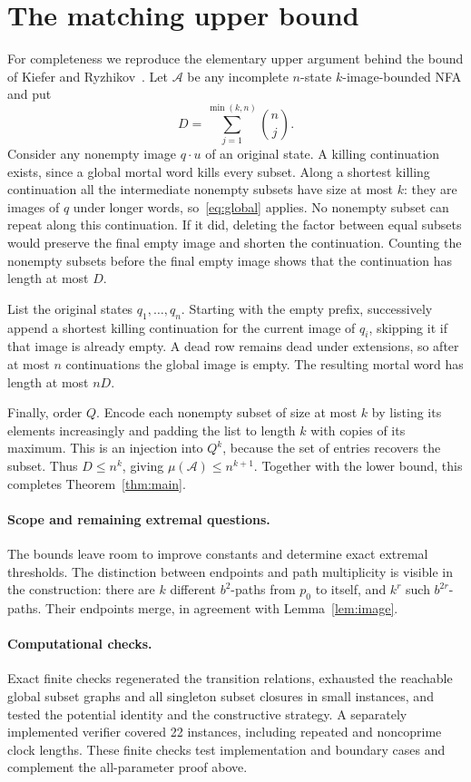 \documentclass[acmsmall,screen,nonacm,11pt]{acmart}
\newcommand{\calA}{\mathcal{A}}
\begin{document}
\section{The matching upper bound}

For completeness we reproduce the elementary upper argument behind the
bound of Kiefer and Ryzhikov~\cite[Section~9]{KR2025}.
Let $\calA$ be any incomplete $n$-state $k$-image-bounded NFA and put
\[
 D=\sum_{j=1}^{\min(k,n)}\binom nj.
\]
Consider any nonempty image $q\cdot u$ of an original state.
A killing continuation exists, since a global mortal word kills every
subset. Along a shortest killing continuation all the intermediate
nonempty subsets have size at most $k$: they are images of $q$ under
longer words, so~\eqref{eq:global} applies.
No nonempty subset can repeat along this continuation. If it did, deleting
the factor between equal subsets would preserve the final empty image and
shorten the continuation. Counting the nonempty subsets before the final
empty image shows that the continuation has length at most $D$.

List the original states $q_1,\ldots,q_n$. Starting with the empty prefix,
successively append a shortest killing continuation for the current image
of $q_i$, skipping it if that image is already empty. A dead row remains
dead under extensions, so after at most $n$ continuations the global image
is empty. The resulting mortal word has length at most $nD$.

Finally, order $Q$. Encode each nonempty subset of size at most $k$ by
listing its elements increasingly and padding the list to length $k$ with
copies of its maximum. This is an injection into $Q^k$, because the set of
entries recovers the subset. Thus $D\leq n^k$, giving
$\mu(\calA)\leq n^{k+1}$. Together with the lower bound, this completes
Theorem~\ref{thm:main}.

\paragraph{Scope and remaining extremal questions.}
The bounds leave room to improve constants and determine exact extremal
thresholds. The distinction
between endpoints and path multiplicity is visible in the construction:
there are $k$ different $b^2$-paths from $p_0$ to itself, and $k^r$ such
$b^{2r}$-paths. Their endpoints merge, in agreement with
Lemma~\ref{lem:image}.

\paragraph{Computational checks.}
Exact finite checks regenerated the transition relations, exhausted the
reachable global subset graphs and all singleton subset closures in small
instances, and tested the potential identity and the constructive strategy.
A separately implemented verifier covered 22 instances, including repeated
and noncoprime clock lengths. These finite checks test implementation and boundary cases and complement
the all-parameter proof above.
\end{document}
